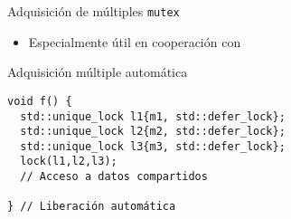 \begin{frame}[t,fragile]{Adquisición de múltiples \texttt{mutex}}
\begin{itemize}
  \item Especialmente útil en cooperación con 
\end{itemize}

\begin{block}{Adquisición múltiple automática}
\begin{lstlisting}
void f() {
  std::unique_lock l1{m1, std::defer_lock};
  std::unique_lock l2{m2, std::defer_lock};
  std::unique_lock l3{m3, std::defer_lock};
  lock(l1,l2,l3);
  // Acceso a datos compartidos

} // Liberación automática
\end{lstlisting}
\end{block}
\end{frame}
